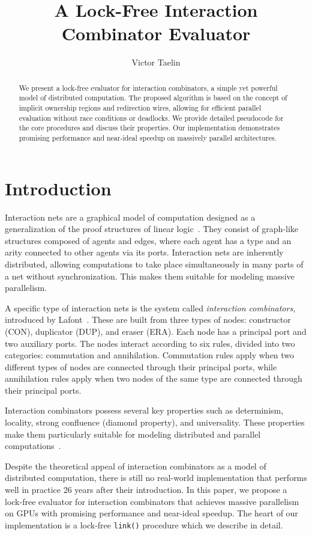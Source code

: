 \documentclass{article}
\title{A Lock-Free Interaction Combinator Evaluator}
\author{Victor Taelin}
\date{}
\begin{document}
\maketitle

\begin{abstract}
We present a lock-free evaluator for interaction combinators, a simple yet powerful model of distributed computation. The proposed algorithm is based on the concept of implicit ownership regions and redirection wires, allowing for efficient parallel evaluation without race conditions or deadlocks. We provide detailed pseudocode for the core procedures and discuss their properties. Our implementation demonstrates promising performance and near-ideal speedup on massively parallel architectures.
\end{abstract}

\section{Introduction}\label{s:introduction}

Interaction nets are a graphical model of computation designed as a generalization of the proof structures of linear logic~\cite{girard}. They consist of graph-like structures composed of agents and edges, where each agent has a type and an arity connected to other agents via its ports. Interaction nets are inherently distributed, allowing computations to take place simultaneously in many parts of a net without synchronization. This makes them suitable for modeling massive parallelism.

A specific type of interaction nets is the system called \textit{interaction combinators}, introduced by Lafont~\cite{lafont}. These are built from three types of nodes: constructor (CON), duplicator (DUP), and eraser (ERA). Each node has a principal port and two auxiliary ports. The nodes interact according to six rules, divided into two categories: commutation and annihilation. Commutation rules apply when two different types of nodes are connected through their principal ports, while annihilation rules apply when two nodes of the same type are connected through their principal ports.

Interaction combinators possess several key properties such as determinism, locality, strong confluence (diamond property), and universality. These properties make them particularly suitable for modeling distributed and parallel computations~\cite{lafont}.

Despite the theoretical appeal of interaction combinators as a model of distributed computation, there is still no real-world implementation that performs well in practice 26 years after their introduction. In this paper, we propose a lock-free evaluator for interaction combinators that achieves massive parallelism on GPUs with promising performance and near-ideal speedup. The heart of our implementation is a lock-free \texttt{link()} procedure which we describe in detail.
\end{document}
